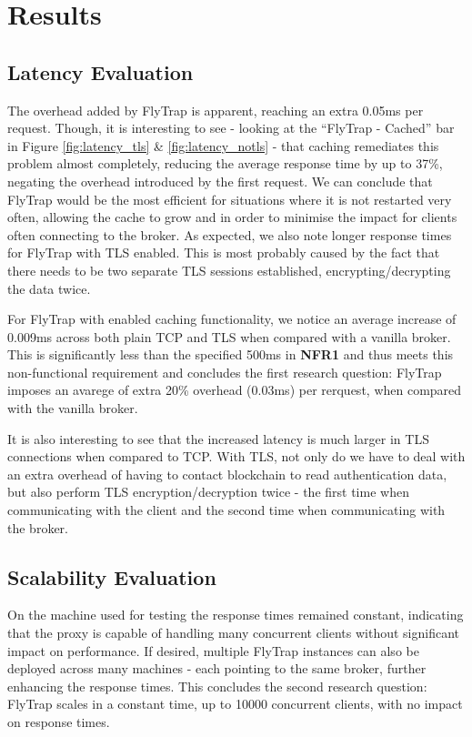 \section{Results}
\subsection{Latency Evaluation}
The overhead added by FlyTrap is apparent, reaching an extra 0.05ms per request. Though, it is interesting to see - looking at the ``FlyTrap - Cached'' bar in Figure \ref{fig:latency_tls} \& \ref{fig:latency_notls} - that caching remediates this problem almost completely, reducing the average response time by up to 37\%, negating the overhead introduced by the first request. We can conclude that FlyTrap would be the most efficient for situations where it is not restarted very often, allowing the cache to grow and in order to minimise the impact for clients often connecting to the broker. As expected, we also note longer response times for FlyTrap with TLS enabled. This is most probably caused by the fact that there needs to be two separate TLS sessions established, encrypting/decrypting the data twice.

For FlyTrap with enabled caching functionality, we notice an average increase of 0.009ms across both plain TCP and TLS when compared with a vanilla broker. This is significantly less than the specified 500ms in \textbf{NFR1} and thus meets this non-functional requirement and concludes the first research question: FlyTrap imposes an avarege of extra 20\% overhead (0.03ms) per rerquest, when compared with the vanilla broker.

It is also interesting to see that the increased latency is much larger in TLS connections when compared to TCP. With TLS, not only do we have to deal with an extra overhead of having to contact blockchain to read authentication data, but also perform TLS encryption/decryption twice - the first time when communicating with the client and the second time when communicating with the broker.
\subsection{Scalability Evaluation}
On the machine used for testing the response times remained constant, indicating that the proxy is capable of handling many concurrent clients without significant impact on performance. If desired, multiple FlyTrap instances can also be deployed across many machines - each pointing to the same broker, further enhancing the response times. This concludes the second research question: FlyTrap scales in a constant time, up to 10000 concurrent clients, with no impact on response times.

